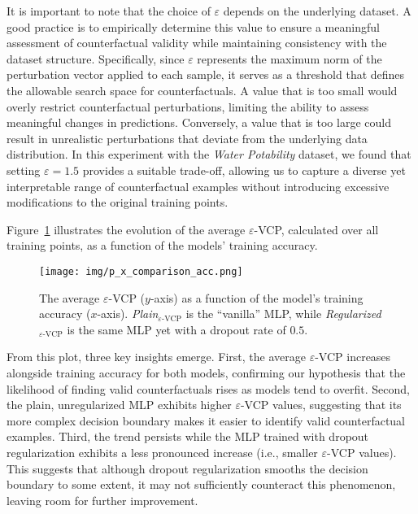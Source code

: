 It is important to note that the choice of $\varepsilon$ depends on the underlying dataset. A good practice is to empirically determine this value to ensure a meaningful assessment of counterfactual validity while maintaining consistency with the dataset structure. Specifically, since $\varepsilon$ represents the maximum norm of the perturbation vector applied to each sample, it serves as a threshold that defines the allowable search space for counterfactuals.  
A value that is too small would overly restrict counterfactual perturbations, limiting the ability to assess meaningful changes in predictions. Conversely, a value that is too large could result in unrealistic perturbations that deviate from the underlying data distribution.  
In this experiment with the \textit{Water Potability} dataset, we found that setting $\varepsilon=1.5$ provides a suitable trade-off, allowing us to capture a diverse yet interpretable range of counterfactual examples without introducing excessive modifications to the original training points.


Figure~\ref{fig:evcp} illustrates the evolution of the average $\varepsilon$-VCP, calculated over all training points, as a function of the models' training accuracy.
\begin{figure}
    \centering
    \texttt{[image: img/p\_x\_comparison\_acc.png]}
    \caption{The average $\varepsilon$-VCP ($y$-axis) as a function of the model's training accuracy ($x$-axis). \textit{Plain}$_{\varepsilon\text{-VCP}}$ is the ``vanilla'' MLP, while \textit{Regularized}$_{\varepsilon\text{-VCP}}$ is the same MLP yet with a dropout rate of $0.5$.}
    \label{fig:evcp}
\end{figure}
From this plot, three key insights emerge.
First, the average $\varepsilon$-VCP increases alongside training accuracy for both models, confirming our hypothesis that the likelihood of finding valid counterfactuals rises as models tend to overfit.
Second, the plain, unregularized MLP exhibits higher $\varepsilon$-VCP values, suggesting that its more complex decision boundary makes it easier to identify valid counterfactual examples.
Third, the trend persists while the MLP trained with dropout regularization exhibits a less pronounced increase (i.e., smaller $\varepsilon$-VCP values). This suggests that although dropout regularization smooths the decision boundary to some extent, it may not sufficiently counteract this phenomenon, leaving room for further improvement.



